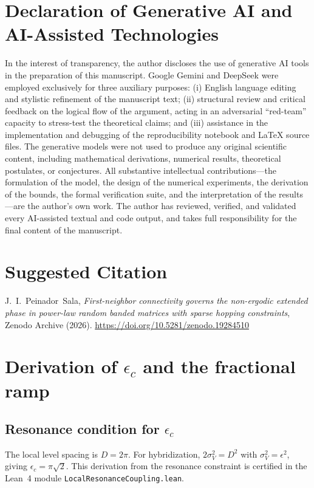 \documentclass[11pt,a4paper]{article}
\begin{document}
\section*{Declaration of Generative AI and AI-Assisted Technologies}
In the interest of transparency, the author discloses the use of generative
AI tools in the preparation of this manuscript. Google Gemini and DeepSeek
were employed exclusively for three auxiliary purposes: (i) English language
editing and stylistic refinement of the manuscript text; (ii) structural
review and critical feedback on the logical flow of the argument, acting in
an adversarial ``red-team'' capacity to stress-test the theoretical claims;
and (iii) assistance in the implementation and debugging of the
reproducibility notebook and LaTeX source files. The generative models were
not used to produce any original scientific content, including mathematical
derivations, numerical results, theoretical postulates, or conjectures.
All substantive intellectual contributions---the formulation of the model,
the design of the numerical experiments, the derivation of the bounds, the
formal verification suite, and the interpretation of the results---are the
author's own work. The author has reviewed, verified, and validated every
AI-assisted textual and code output, and takes full responsibility for the
final content of the manuscript.

\section*{Suggested Citation}
J.~I.~Peinador~Sala, \textit{First-neighbor connectivity governs the
non-ergodic extended phase in power-law random banded matrices with sparse
hopping constraints}, Zenodo Archive (2026).
\url{https://doi.org/10.5281/zenodo.19284510}

\appendix

\section{Derivation of \texorpdfstring{$\epsilon_c$}{epsilon\_c} and the fractional ramp}
\label{app:ramp}

\subsection{Resonance condition for \texorpdfstring{$\epsilon_c$}{epsilon\_c}}
The local level spacing is $D = 2\pi$. For hybridization, $2\sigma_V^2 = D^2$ with $\sigma_V^2 = \epsilon^2$, giving $\epsilon_c = \pi\sqrt{2}$. This derivation from the resonance constraint is certified in the Lean~4 module \texttt{LocalResonanceCoupling.lean}.
\end{document}
